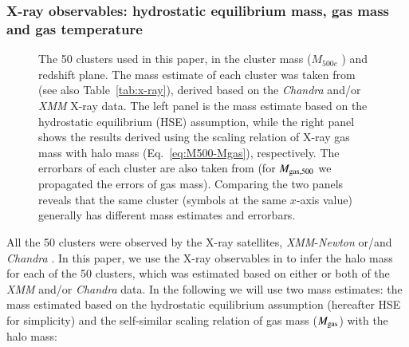 \documentclass[iop, apj]{emulateapj}
\newcommand{\?}{\stackrel{?}{=}}
\begin{document}
\subsubsection{X-ray observables: hydrostatic equilibrium mass, gas mass
  and gas temperature}
\label{sec:x-ray}

 \begin{figure*}
%
\caption{The 50 clusters used in this paper, in the cluster mass
  ($M_{500c}$ ) and redshift plane.  The mass estimate of each cluster
  was taken from \citet{Martinoetal:14} (see also
  Table~\ref{tab:x-ray}), derived based on the {\it Chandra} and/or {\it
  XMM} X-ray data.  The left panel is the mass estimate based on the
  hydrostatic equilibrium (HSE) assumption, while the right panel shows
  the results derived using the scaling relation of X-ray gas mass with
  halo mass (Eq.~\ref{eq:M500-Mgas}), respectively. The errorbars of
  each cluster are also taken from \cite{Martinoetal:14} (for
  $M_{\rm gas, 500}$ we propagated the errors of gas mass). Comparing
  the two panels reveals that the same cluster (symbols at the same
  $x$-axis value) generally has different mass estimates and errorbars.
  } \label{fig:m-z}
\end{figure*}
%
All the 50 clusters were observed by the X-ray satellites, {\it
XMM}-{\it Newton} or/and {\it Chandra}
\citep{Zhangetal:10,Martinoetal:14}.  In this paper, we use the X-ray
observables in \citet{Martinoetal:14} to infer the halo mass for each of
the 50 clusters, which was estimated based on either or both of the {\it
XMM} and/or {\it Chandra} data. In the following we will use two mass
estimates: the mass estimated based on the hydrostatic equilibrium
assumption (hereafter HSE for simplicity) and the self-similar scaling
relation of gas mass ($M_{\rm gas}$) with the halo mass:
%
\end{document}
